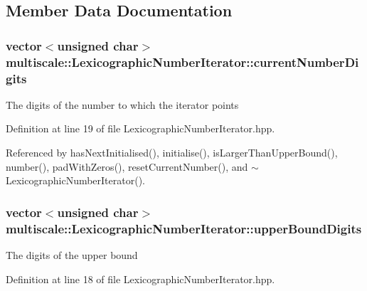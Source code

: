 \subsection{Member Data Documentation}
\hypertarget{classmultiscale_1_1LexicographicNumberIterator_af42ebeea695a31c2da714332c520ae79}{
\subsubsection[{current\-Number\-Digits}]{\setlength{\rightskip}{0pt plus 5cm}vector$<$unsigned char$>$ multiscale\-::\-Lexicographic\-Number\-Iterator\-::current\-Number\-Digits\hspace{0.3cm}{\ttfamily [private]}}}\label{classmultiscale_1_1LexicographicNumberIterator_af42ebeea695a31c2da714332c520ae79}
The digits of the number to which the iterator points 

Definition at line 19 of file Lexicographic\-Number\-Iterator.\-hpp.



Referenced by has\-Next\-Initialised(), initialise(), is\-Larger\-Than\-Upper\-Bound(), number(), pad\-With\-Zeros(), reset\-Current\-Number(), and $\sim$\-Lexicographic\-Number\-Iterator().

\hypertarget{classmultiscale_1_1LexicographicNumberIterator_a909a054ae4d3e79e5daa3059a94000d0}{
\subsubsection[{upper\-Bound\-Digits}]{\setlength{\rightskip}{0pt plus 5cm}vector$<$unsigned char$>$ multiscale\-::\-Lexicographic\-Number\-Iterator\-::upper\-Bound\-Digits\hspace{0.3cm}{\ttfamily [private]}}}\label{classmultiscale_1_1LexicographicNumberIterator_a909a054ae4d3e79e5daa3059a94000d0}
The digits of the upper bound 

Definition at line 18 of file Lexicographic\-Number\-Iterator.\-hpp.



